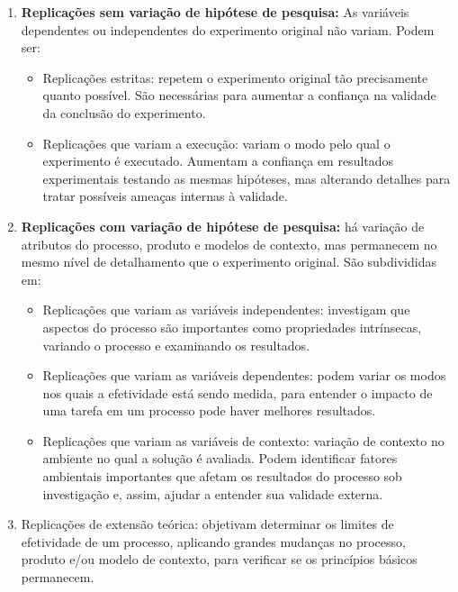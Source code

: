 \begin{enumerate}
\item \textbf{Replicações sem variação de hipótese de pesquisa:} 
As variáveis dependentes ou independentes do experimento original não variam. Podem ser: 

\begin{itemize}
\item Replicações estritas: repetem o experimento original tão precisamente quanto possível. São necessárias para aumentar a confiança na validade da conclusão do experimento.
\item Replicações que variam a execução: variam o modo pelo qual o experimento é executado. Aumentam a confiança em resultados experimentais testando as mesmas hipóteses, mas alterando detalhes para tratar possíveis ameaças internas à validade.
\end{itemize}


\item \textbf{Replicações com variação de hipótese de pesquisa:} 
há variação de atributos do processo, produto e modelos de contexto, mas permanecem no mesmo nível de detalhamento que o experimento original. São subdivididas em: 

\begin{itemize}
\item Replicações que variam as variáveis independentes: investigam que aspectos do processo são importantes como propriedades intrínsecas, variando o processo e examinando os resultados.

\item Replicações que variam as variáveis dependentes: podem variar os modos nos quais a efetividade está sendo medida, para entender o impacto de uma tarefa em um processo pode haver melhores resultados.

\item Replicações que variam as variáveis de contexto: variação de contexto no ambiente no qual a solução é avaliada. Podem identificar fatores ambientais importantes que afetam os resultados do processo sob investigação e, assim, ajudar a entender sua validade externa.
\end{itemize}


\item Replicações de extensão teórica: objetivam determinar os limites de efetividade de um processo, aplicando grandes mudanças no processo, produto e/ou modelo de contexto, para verificar se os princípios básicos permanecem.

\end{enumerate}


